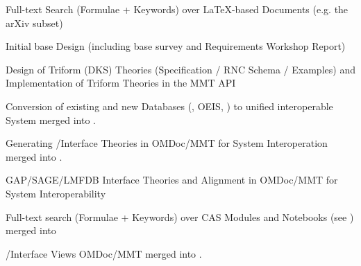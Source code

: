 \begin{workpackage}[id=dksbases,%
  title=Data/Knowledge/Software-Bases,lead=FAU,
  ZHRM=12,JURM=12,FAURM=34,UWRM=25,SARM=10,LLRM=2,PSRM=25]
\begin{wpdelivs}
\begin{wpdeliv}[id=mws,miles=startup,due=9,nature=OTHER,dissem=PU,lead=JU,issue=133, status=submitted]
    {Full-text Search (Formulae + Keywords) over LaTeX-based Documents
      (e.g. the arXiv subset)}
  \end{wpdeliv}
  \begin{wpdeliv}[due=12,miles=startup,id=design,dissem=PU,nature=R,lead=JU,issue=136, status=submitted]
    {Initial \DKS base Design (including base survey and Requirements Workshop Report)}
  \end{wpdeliv}
  \begin{wpdeliv}[due=15,miles=proto1,id=dkstheories,dissem=PU,nature=R,lead=JU,issue=137, status=submitted]
    {Design of Triform (DKS) Theories (Specification / RNC Sche\-ma / Examples) and 
      Implementation of Triform Theories in the MMT API}
  \end{wpdeliv}
  \begin{wpdeliv}[due=24,miles=proto1,id=conv,dissem=PU,nature=DEC,lead=ZH,issue=138,status=canceled]
    {Conversion of existing and new Databases (\LMFDB, OEIS, \FindStat) to unified interoperable
      System}
    merged into .
  \end{wpdeliv}
  \begin{wpdeliv}[due=24,miles=proto1,id=psfoundation,dissem=PU,nature=OTHER,lead=FAU,issue=139,status=canceled]
    {Generating \GAP/\Sage Interface Theories in OMDoc/MMT for System Interoperation}
    merged into .
  \end{wpdeliv}
  \begin{wpdeliv}[due=30,miles=community,id=interface-theories,dissem=PU,nature=OTHER,lead=FAU]
    {GAP/SAGE/LMFDB Interface Theories and Alignment in OMDoc/MMT for System
      Interoperability}
  \end{wpdeliv}
  \begin{wpdeliv}[id=notebooksearch,due=30,nature=OTHER,dissem=PU,lead=FAU,issue=140,status=canceled]
    {Full-text search (Formulae + Keywords) over CAS Modules and Notebooks} (see
      )
    merged into 
  \end{wpdeliv}
  \begin{wpdeliv}[due=36,miles=community,id=pssem,dissem=PU,nature=OTHER,lead=FAU,issue=141,status=canceled]
    {\GAP/\Sage Interface Views OMDoc/MMT}
    merged into .
  \end{wpdeliv}

\end{wpdelivs}
\end{workpackage}

